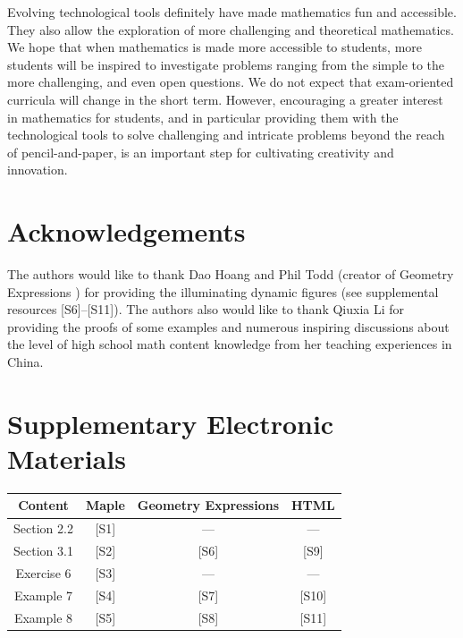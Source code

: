 \documentclass[12pt,a4paper]{article}%
\begin{document}
Evolving technological tools definitely have made mathematics fun and
accessible. They also allow the exploration of more
challenging and theoretical mathematics. We hope that when mathematics is made
more accessible to students, more students will be inspired to
investigate problems ranging from the simple to the more challenging, and even open questions.
We do not expect that exam-oriented curricula will change in the short term.
However, encouraging a greater interest in mathematics for students, and in
particular providing them with the technological tools to solve challenging
and intricate problems beyond the reach of pencil-and-paper, is an important
step for cultivating creativity and innovation.

\section{Acknowledgements} \label{ack}

The authors would like to thank Dao Hoang and Phil Todd
(creator of Geometry Expressions \cite{GE})
for providing the illuminating dynamic figures 
(see supplemental resources [S6]--[S11]). The authors also would like to thank Qiuxia Li for providing the
proofs of some examples and numerous inspiring discussions about the level of
high school math content knowledge from her teaching experiences in China.

\section{Supplementary Electronic Materials}

\begin{center}
 \begin{tabular}{|c|c|c|c|} \hline
   Content & Maple & Geometry Expressions & HTML \\ \hline
   Section 2.2 & [S1] & --- & --- \\
   Section 3.1 & [S2] & [S6] & [S9] \\
   Exercise 6  & [S3] & ---    & --- \\
   Example 7  & [S4] & [S7] & [S10] \\
   Example 8  & [S5] & [S8] & [S11] \\ \hline
 \end{tabular}
\end{center}
\end{document}
